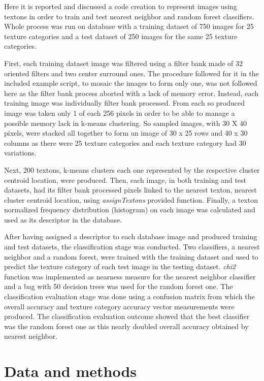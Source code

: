 \documentclass[10pt,twocolumn,letterpaper]{article}
\begin{document}
Here it is reported and discussed a code creation to represent images using textons in order to train and test nearest neighbor and random forest classifiers. Whole process was run on database with a training dataset of 750 images for 25 texture categories and a test dataset of 250 images for the same 25 texture categories.

First, each training dataset image was filtered using a filter bank made of 32 oriented filters and two center surround ones. The procedure followed for it in the included example script, \ie to mosaic the images to form only one,  was not followed here as the filter bank process aborted with a lack of memory error. Instead, each training image was individually filter bank processed.  From each so produced image was taken only 1 of each 256 pixels in order to be able to manage a possible memory lack in k-means clustering. So sampled images, with 30 X 40 pixels, were stacked all together to form an image of 30 x 25 rows and 40 x 30 columns as there were 25 texture categories and each texture category had 30 variations.

Next, 200 textons, \ie k-means clusters each one represented by the respective cluster centroid location, were produced. Then, each image, in both training and test datasets, had its filter bank processed pixels linked to the nearest texton, \ie nearest cluster centroid location, using \textit{assignTextons} provided function. Finally, a texton normalized frequency distribution (histogram) on each image was calculated and used as its descriptor in the database.

After having assigned a descriptor to each database image and produced training and test datasets,  the classification stage was conducted. Two classifiers, a nearest neighbor and a random forest, were trained with the training dataset and used to predict the texture category of each test image in the testing dataset. \textit{chi2} function was implemented as nearness measure for the nearest neighbor classifier and a bag with 50 decision trees was used for the random forest one. The classification evaluation stage was done using a confusion matrix from which the overall accuracy and  texture category accuracy vector measurements were produced. The classification evaluation outcome  showed that the best classifier was the random forest one as this nearly doubled overall accuracy obtained by nearest neighbor.

\section{Data and methods}
\end{document}
